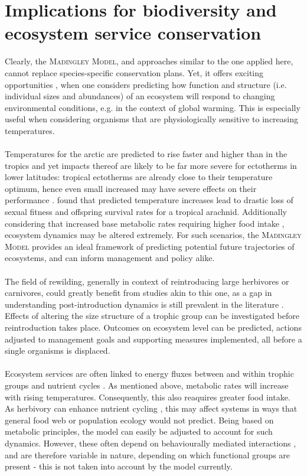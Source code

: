 \section{Implications for biodiversity and ecosystem service conservation }
Clearly, the \textsc{Madingley Model}, and approaches similar to the one applied here, cannot replace species-specific conservation  plans. Yet, it offers exciting opportunities , when one considers predicting how function and structure (i.e. individual sizes and abundances) of an ecosystem will respond to changing environmental conditions, e.g. in the context of global warming. This is especially useful when considering organisms that are physiologically sensitive to increasing temperatures.\\\\
Temperatures for the arctic are predicted to rise faster and higher than in the tropics  \citep{Parry2007} and yet impacts thereof are likely to be far more severe for ectotherms in lower latitudes: tropical ectotherms are already close to their temperature optimum, hence even small increased may have severe effects on their performance \citep{Deutsch2008}. \cite{Zeh2012} found that predicted temperature increases lead to drastic loss of sexual fitness and offspring survival rates for a tropical arachnid. Additionally considering that increased base metabolic rates requiring higher food intake \citep{Dillon2010}, ecosystem dynamics may be altered extremely. For such scenarios, the \textsc{Madingley Model} provides an ideal framework of predicting potential future trajectories of ecosystems, and  can inform management and policy alike.\\\\
The field of rewilding, generally in context of reintroducing large herbivores or carnivores, could greatly benefit from studies akin to this one, as a gap in understanding post-introduction dynamics is still prevalent in the literature \citep[e.g.][]{Grange2012,Smit2015}. Effects of altering the size structure of a trophic group can be investigated before reintroduction takes place. Outcomes on ecosystem level can be predicted, actions adjusted to management goals and supporting measures implemented, all before a single organisms is displaced. \\\\ 
Ecosystem services are often linked to energy fluxes between and within trophic groups and nutrient cycles \citep{Cardinale2012}. As mentioned above, metabolic rates will increase with rising temperatures. Consequently, this also reaquires greater food intake. As herbivory can enhance nutrient cycling \cite{Belovsky2000}, this may affect systems in ways that general food web or population ecology would not predict. Being based on metabolic principles, the model can easily be adjusted to account for such dynamics. However, these often depend on behaviourally mediated interactions \cite{Hawlena2010}, and are therefore variable in nature, depending on which functional groups are present - this is not taken into account by the model currently.
